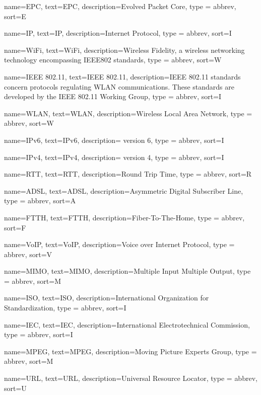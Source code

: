 %
{%
	name={EPC},
	text={EPC},
	description={Evolved Packet Core},
	type = {abbrev},
	sort={E}
}

%
{%
	name={IP},
	text={IP},
	description={Internet Protocol},
	type = {abbrev},
	sort={I}
}

%
{%
	name={WiFi},
	text={WiFi},
	description={Wireless Fidelity, a wireless networking technology encompassing \gls{IEEE802} standards},
	type = {abbrev},
	sort={W}
}

%
{%
	name={IEEE 802.11},
	text={IEEE 802.11},
	description={IEEE 802.11 standards concern protocols regulating \gls{WLAN} communications. These standards are developed by the IEEE 802.11 Working Group},
	type = {abbrev},
	sort={I}
}

%
{%
	name={WLAN},
	text={WLAN},
	description={Wireless Local Area Network},
	type = {abbrev},
	sort={W}
}

%
{%
	name={IPv6},
	text={IPv6},
	description={ version 6},
	type = {abbrev},
	sort={I}
}

%
{%
	name={IPv4},
	text={IPv4},
	description={ version 4},
	type = {abbrev},
	sort={I}
}

%
{%
	name={RTT},
	text={RTT},
	description={Round Trip Time},
	type = {abbrev},
	sort={R}
}

%
{%
	name={ADSL},
	text={ADSL},
	description={Asymmetric Digital Subscriber Line},
	type = {abbrev},
	sort={A}
}

%
{%
	name={FTTH},
	text={FTTH},
	description={Fiber-To-The-Home},
	type = {abbrev},
	sort={F}
}


%
{%
	name={VoIP},
	text={VoIP},
	description={Voice over Internet Protocol},
	type = {abbrev},
	sort={V}
}


%
{%
	name={MIMO},
	text={MIMO},
	description={Multiple Input Multiple Output},
	type = {abbrev},
	sort={M}
}

%
{%
	name={ISO},
	text={ISO},
	description={International Organization for Standardization},
	type = {abbrev},
	sort={I}
}

%
{%
	name={IEC},
	text={IEC},
	description={International Electrotechnical Commission},
	type = {abbrev},
	sort={I}
}


%
{%
	name={MPEG},
	text={MPEG},
	description={Moving Picture Experts Group},
	type = {abbrev},
	sort={M}
}

%
{%
	name={URL},
	text={URL},
	description={Universal Resource Locator},
	type = {abbrev},
	sort={U}
}